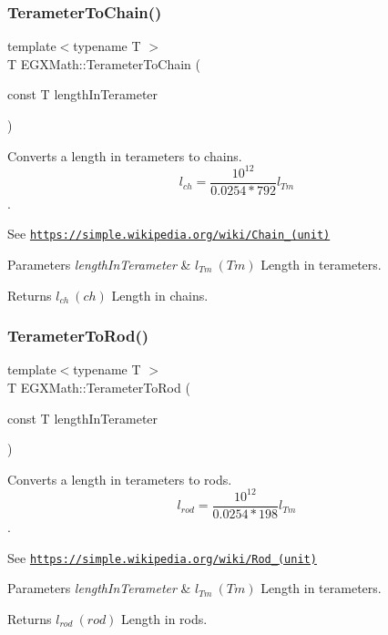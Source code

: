 \subsubsection{\texorpdfstring{Terameter\+To\+Chain()}{TerameterToChain()}}
{\footnotesize\ttfamily template$<$typename T $>$ \\
T E\+G\+X\+Math\+::\+Terameter\+To\+Chain (\begin{DoxyParamCaption}\item[{const T}]{length\+In\+Terameter }\end{DoxyParamCaption})}



Converts a length in terameters to chains. \[ l_{ch}= \frac{10^{12}}{0.0254 * 792} l_{Tm} \]. 

See \href{https://simple.wikipedia.org/wiki/Chain_(unit)}{\tt https\+://simple.\+wikipedia.\+org/wiki/\+Chain\+\_\+(unit)} 
\begin{DoxyParams}{Parameters}
{\em length\+In\+Terameter} & $ l_{Tm}\ (Tm)$ Length in terameters. \\
\hline
\end{DoxyParams}
\begin{DoxyReturn}{Returns}
$ l_{ch}\ (ch)$ Length in chains. 
\end{DoxyReturn}
\mbox{\label{group___e_g_x_math-_conversions-_length_conversions-_terameter-_surveyors_gaa3d08b1f4809bc73a7194ab85c849737}} 
\subsubsection{\texorpdfstring{Terameter\+To\+Rod()}{TerameterToRod()}}
{\footnotesize\ttfamily template$<$typename T $>$ \\
T E\+G\+X\+Math\+::\+Terameter\+To\+Rod (\begin{DoxyParamCaption}\item[{const T}]{length\+In\+Terameter }\end{DoxyParamCaption})}



Converts a length in terameters to rods. \[ l_{rod}= \frac{10^{12}}{0.0254 * 198} l_{Tm} \]. 

See \href{https://simple.wikipedia.org/wiki/Rod_(unit)}{\tt https\+://simple.\+wikipedia.\+org/wiki/\+Rod\+\_\+(unit)} 
\begin{DoxyParams}{Parameters}
{\em length\+In\+Terameter} & $ l_{Tm}\ (Tm)$ Length in terameters. \\
\hline
\end{DoxyParams}
\begin{DoxyReturn}{Returns}
$ l_{rod}\ (rod)$ Length in rods. 
\end{DoxyReturn}
